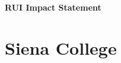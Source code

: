 \documentclass[12pt, preprint]{aastex}
\begin{document}
{\Large{\bf RUI Impact Statement}}
\vspace*{2mm}

%

\section{Siena College}
\end{document}
